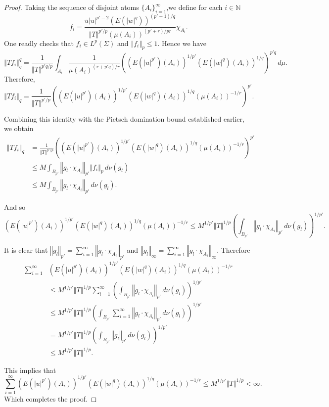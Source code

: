 \documentclass[10pt,a4paper]{amsart}
\newcommand{\norm}[1]{\left\Vert#1\right\Vert}
\begin{document}
\begin{proof}
	Taking the sequence of disjoint atoms $\{A_i\}_{i=1}^{\infty}$,we define for each $i \in \mathbb N$
	\[
	f_i = \frac{\overline u |u|^{{p'}-2} (E(|w|^q))^{({p'}-1)/q}}{\norm{T}^{{p'}/p} (\mu(A_i))^{({p'}+r)/pr}} \chi_{A_i}.
	\]
	One readly checks that $f_i \in L^p(\Sigma)$ and $\norm{f_i}_p \leq 1$. Hence we have
	\[
	\norm{T f_i}_q^q = \frac{1}{\norm{T}^{p'q/p}} \int_{A_i} \frac{1}{\mu(A_i)^{({r+p'q})/r}} \left( (E(|u|^{p'})(A_i))^{1/{p'}} (E(|w|^q)(A_i))^{1/q} \right)^{p'q} \, d\mu.
	\]
	Therefore,
	\[
	\norm{T f_i}_q = \frac{1}{\norm{T}^{{p'}/p}} \left( (E(|u|^{p'})(A_i))^{1/{p'}} (E(|w|^q)(A_i))^{1/q} (\mu(A_i))^{-1/r} \right)^{p'}.
	\]
	
	Combining this identity with the Pietsch domination bound established earlier, we obtain
	\begin{align*}
		\norm{T f_i}_q &= \frac{1}{\norm{T}^{{p'}/p}} \left( (E(|u|^{p'})(A_i))^{1/{p'}} (E(|w|^q)(A_i))^{1/q} (\mu(A_i))^{-1/r} \right)^{p'} \\
		&\leq M \int_{B_{p'}} \norm{g_l\cdot \chi_{A_i}}_{p'} \norm{f_i}_p \, d\nu(g_l) \\
		&\leq M \int_{B_{p'}} \norm{g_l\cdot \chi_{A_i}}_{p'} \, d\nu(g_l).
	\end{align*}
	
	And so
	\[
	(E(|u|^{p'})(A_i))^{1/{p'}} (E(|w|^q)(A_i))^{1/q} (\mu(A_i))^{-1/r} \leq M^{1/{p'}} \norm{T}^{1/p} \left( \int_{B_{p'}} \norm{g_l \cdot\chi_{A_i}}_{p'} \, d\nu(g_l) \right)^{1/{p'}}.
	\]
	
	It is clear that $\norm{g_l}_{p'} = \sum_{i=1}^{\infty} \norm{g_l\cdot \chi_{A_i}}_{p'} $ and $\norm{g_l}_{\infty} = \sum_{i=1}^{\infty} \norm{g_l\cdot \chi_{A_i}}_{\infty} $. Therefore
	\begin{align*}
		\sum_{i=1}^{\infty} & (E(|u|^{p'})(A_i))^{1/{p'}} (E(|w|^q)(A_i))^{1/q} (\mu(A_i))^{-1/r} \\
		&\leq M^{1/{p'}} \norm{T}^{1/p} \sum_{i=1}^{\infty} \left( \int_{B_{p'}} \norm{g_l\cdot \chi_{A_i}}_{p'} \, d\nu(g_l) \right)^{1/{p'}} \\
		&\leq M^{1/{p'}} \norm{T}^{1/p} \left( \int_{B_{p'}} \sum_{i=1}^{\infty} \norm{g_l\cdot\chi_{A_i}}_{p'} \, d\nu(g_l) \right)^{1/{p'}} \\
		&= M^{1/{p'}} \norm{T}^{1/p} \left( \int_{B_{p'}} \norm{g_l}_{p'} \, d\nu(g_l) \right)^{1/{p'}} \\
		&\leq M^{1/{p'}} \norm{T}^{1/p}.
	\end{align*}
	
	This implies that
	\[
	\sum_{i=1}^{\infty} (E(|u|^{p'})(A_i))^{1/{p'}} (E(|w|^q)(A_i))^{1/q} (\mu(A_i))^{-1/r} \leq M^{1/{p'}} \norm{T}^{1/p} < \infty.
	\]
	Which completes the proof.
\end{proof}
\end{document}
